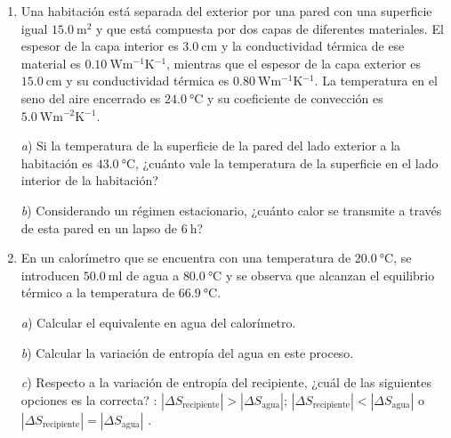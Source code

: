 \documentclass[a4paper,11pt,dvipsnames]{article}
\begin{document}

\begin{enumerate}[leftmargin=*]

  \item Una habitación está separada del exterior por una pared con una superficie igual $\SI{15.0}{\metre\squared}$ y que está compuesta por dos capas de diferentes materiales. El espesor de la capa interior es $\SI{3.0}{\centi\metre}$ y la conductividad térmica de ese material es $\SI{0.10}{\watt\metre^{-1}\kelvin^{-1}}$, mientras que el espesor de la capa exterior es $\SI{15.0}{\centi\metre}$ y su conductividad térmica es $\SI{0.80}{\watt\metre^{-1}\kelvin^{-1}}$. La temperatura en el seno del aire encerrado es $\SI{24.0}{\celsius}$ y su coeficiente de convección es $\SI{5.0}{\watt\metre^{-2}\kelvin^{-1}}$.\par
  \textit{a}) Si la temperatura de la superficie de la pared del lado exterior a la habitación es $\SI{43.0}{\celsius}$, ¿cuánto vale la temperatura de la superficie en el lado interior de la habitación?\par
  \textit{b}) Considerando un régimen estacionario, ¿cuánto calor se transmite a través de esta pared en un lapso de $\SI{6}{\hour}$?

  \item En un calorímetro que se encuentra con una temperatura de $\SI{20.0}{\celsius}$, se introducen $\SI{50.0}{\milli\litre}$ de agua a $\SI{80.0}{\celsius}$ y se observa que alcanzan el equilibrio térmico a la temperatura de $\SI{66.9}{\celsius}$.\par
  \textit{a}) Calcular el equivalente en agua del calorímetro.\par
  \textit{b}) Calcular la variación de entropía del agua en este proceso.\par
  \textit{c}) Respecto a la variación de entropía del recipiente, ¿cuál de las siguientes opciones es la correcta? : $|\Delta S_\text{recipiente}| > |\Delta S_\text{agua}|$; $|\Delta S_\text{recipiente}| < |\Delta S_\text{agua}|$ o $|\Delta S_\text{recipiente}| = |\Delta S_\text{agua}|$ .


\end{enumerate}
\end{document}
